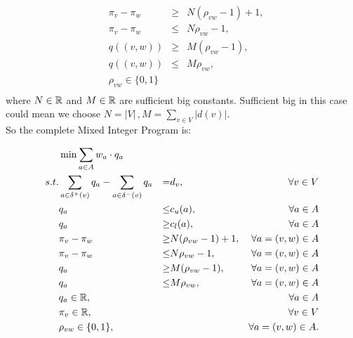 \begin{align*}
 &\pi_v-\pi_w &\ge & N(\rho_{vw}-1)+1,\\
 &\pi_v-\pi_w&\le &N\rho_{vw}-1 ,\\
 &q((v,w))&\ge& M(\rho_{vw}-1),\\
 &q((v,w))&\le & M\rho_{vw},\\
 &\rho_{vw} \in \{0,1\}&&\\
\end{align*}
where $N\in \mathbb{R}$ and $M\in \mathbb{R}$ are sufficient big constants. Sufficient big in this case could mean we choose 
$N=|V|\, ,M=\sum_{v\in V}|d(v)|$. \\
So the complete Mixed Integer Program is:

\begin{align*}
  &\min \sum_{a\in A} w_a\cdot q_a & \\
 s.t. & \sum_{a\in \delta^+(v)}q_a - \sum_{a\in\delta^- (v)}q_a &=& d_v,\, &\forall v\in V \\
 & q_a &\le& c_u(a), & \forall a\in A\\
 & q_a &\ge& c_l(a), & \forall a\in A\\
 & \pi_v-\pi_w &\ge & N(\rho_{vw}-1)+1,& \forall a=(v,w)\in A\\
 & \pi_v-\pi_w&\le &N\rho_{vw}-1,& \forall a=(v,w)\in A\\
 & q_a&\ge& M(\rho_{vw}-1),& \forall a=(v,w)\in A\\
 & q_a&\le & M\rho_{vw},& \forall a=(v,w)\in A\\
 & q_a \in \mathbb{R}, & & &\forall a\in A\\
 & \pi_v \in \mathbb{R}, & & & \forall v\in V\\
 & \rho_{vw} \in \{0,1\},&&& \forall a=(v,w)\in A.\\
\end{align*}

